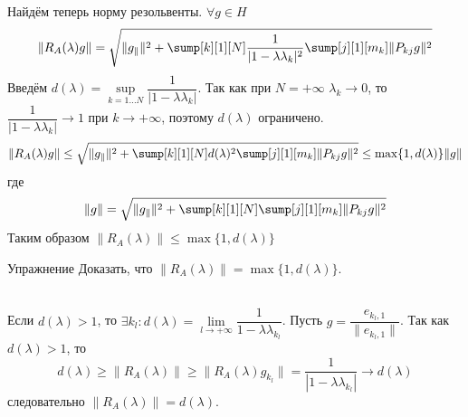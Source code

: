\documentclass[14pt]{extarticle}
\begin{document}
Найдём теперь норму резольвенты.
$\forall g \in H$
$$
\|R_A(\lambda)g\| = \sqrt{\|g_\parallel\|^2 + \sump[k][1][N] \dfrac{1}{|1 - \lambda \lambda_k|
^2} \sump[j][1][m_k]\|P_{kj}g\|^2}
$$
Введём $d(\lambda) = \sup\limits_{k = 1 \dots N} \dfrac{1}{|1 - \lambda \lambda_k|}$.
Так как при $N = +\infty$ $\lambda_k \to 0$, то $\dfrac{1}{|1 - \lambda \lambda_k|} \to 1$ 
при $k \to +\infty$, поэтому $d(\lambda)$ ограничено.
$$
\|R_A(\lambda)g\| \le \sqrt{\|g_\parallel\|^2 + \sump[k][1][N] d(\lambda)^2 \sump[j][1][m_k]\|
P_{kj}g\|^2} \le \max\{1, d(\lambda)\}\|g\|
$$
где 
$$
\|g\| = \sqrt{\|g_\parallel\|^2 + \sump[k][1][N] \sump[j][1][m_k]\|P_{kj}g\|^2}
$$
Таким образом $\|R_A(\lambda)\| \le \max\{1, d(\lambda)\}$
\begin{MathCl}{Упражнение}
Доказать, что $\|R_A(\lambda)\| = \max\{1, d(\lambda)\}$.
\end{MathCl}
\\Если $d(\lambda) > 1$, то $\exists k_l\colon d(\lambda) = \lim\limits_{l \to +\infty} \dfrac{1}
{1 - \lambda\lambda_{k_l}}$.
Пусть $g = \dfrac{e_{k_l, 1}}{\|e_{k_l, 1}\|}$.
Так как $d(\lambda) > 1$, то
$$
d(\lambda) \ge \|R_A(\lambda)\| \ge \|R_A(\lambda)g_{k_l}\| = \dfrac{1}{|1 - \lambda
\lambda_{k_l}|} \to d(\lambda)
$$
следовательно $\|R_A(\lambda)\| = d(\lambda)$.
\end{document}
